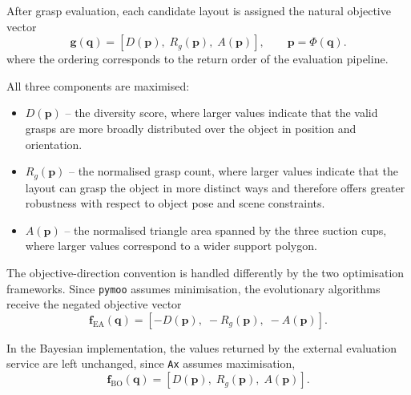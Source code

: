 After grasp evaluation, each candidate layout is assigned the natural objective vector
\begin{equation}
    \mathbf{g}(\mathbf{q})
    =
    [D(\mathbf{p}),\;R_g(\mathbf{p}),\;A(\mathbf{p})],
    \qquad
    \mathbf{p} = \Phi(\mathbf{q}).
\end{equation}
where the ordering corresponds to the return order of the evaluation pipeline.


All three components are maximised:

\begin{itemize}
    \item $D(\mathbf{p})$ -- the diversity score, where larger values indicate that the
          valid grasps are more broadly distributed over the object in position and
          orientation.
    \item $R_g(\mathbf{p})$ -- the normalised grasp count, where larger values indicate
          that the layout can grasp the object in more distinct ways and therefore offers
          greater robustness with respect to object pose and scene constraints.
    \item $A(\mathbf{p})$ -- the normalised triangle area spanned by the three suction
          cups, where larger values correspond to a wider support polygon.
\end{itemize}

The objective-direction convention is handled differently by the two optimisation
frameworks. Since \texttt{pymoo} assumes minimisation, the evolutionary algorithms receive
the negated objective vector
\begin{equation}
    \mathbf{f}_{\mathrm{EA}}(\mathbf{q})
    =
    [-D(\mathbf{p}),\;-R_g(\mathbf{p}),\;-A(\mathbf{p})].
\end{equation}

In the Bayesian implementation, the values returned by the external evaluation service are
left unchanged, since \texttt{Ax} assumes maximisation,
\begin{equation}
    \mathbf{f}_{\mathrm{BO}}(\mathbf{q})
    =
    [D(\mathbf{p}),\;R_g(\mathbf{p}),\;A(\mathbf{p})].
\end{equation}

